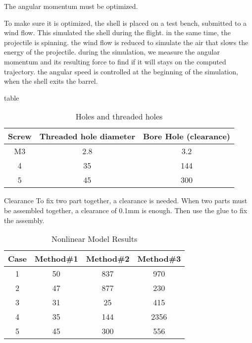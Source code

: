 \documentclass[12pt,a4paper]{article}
\begin{document}
The angular momentum must be optimized.

To make sure it is optimized, the shell is placed on a test bench, submitted to a wind flow. This simulated the shell during the flight. in the same time, the projectile is spinning. 
the wind flow is reduced to simulate the air that slows the energy of the projectile. during the simulation, we measure the angular momentum and its resulting force to find if it will stays on the computed trajectory. 
the angular speed is controlled at the beginning of the simulation, when the shell exits the barrel. 

\newpage

table

\begin{table}[ht]
	\caption{Holes and threaded holes} %
	\centering %
	\begin{tabular}{c c c} %
		\hline\hline %
		Screw & Threaded hole diameter & Bore Hole (clearance) \\ [0.5ex] %
		\hline %
		M3 & 2.8 & 3.2 \\ %
		4 & 35 & 144 \\
		5 & 45 & 300 \\ [1ex] %
		\hline %
	\end{tabular}\label{table:nonlin} %
\end{table}

Clearance
To fix two part together, a clearance is needed.
When two parts must be assembled together, a clearance of 0.1mm is enough. Then use the glue to fix the assembly. 



\begin{table}[ht]
	\caption{Nonlinear Model Results} %
	\centering %
	\begin{tabular}{c c c c} %
		\hline\hline %
		Case & Method\#1 & Method\#2 & Method\#3 \\ [0.5ex] %
		\hline %
		1 & 50 & 837 & 970 \\ %
		2 & 47 & 877 & 230 \\
		3 & 31 & 25 & 415 \\
		4 & 35 & 144 & 2356 \\
		5 & 45 & 300 & 556 \\ [1ex] %
		\hline %
	\end{tabular}\label{table:nonlin} %
\end{table}
\end{document}
